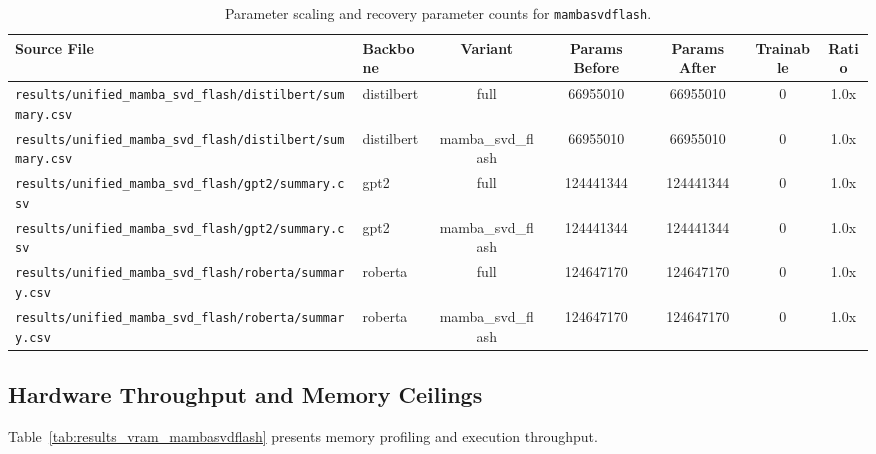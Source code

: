 \begin{table}[t]
\centering
\small
\begin{tabular}{llccccc}
\toprule
\textbf{Source File} & \textbf{Backbone} & \textbf{Variant} & \textbf{Params Before} & \textbf{Params After} & \textbf{Trainable} & \textbf{Ratio} \\
\midrule
\texttt{results/unified\_mamba\_svd\_flash/distilbert/summary.csv} & distilbert & full & 66955010 & 66955010 & 0 & 1.0x \\
\texttt{results/unified\_mamba\_svd\_flash/distilbert/summary.csv} & distilbert & mamba\_svd\_flash & 66955010 & 66955010 & 0 & 1.0x \\
\texttt{results/unified\_mamba\_svd\_flash/gpt2/summary.csv} & gpt2 & full & 124441344 & 124441344 & 0 & 1.0x \\
\texttt{results/unified\_mamba\_svd\_flash/gpt2/summary.csv} & gpt2 & mamba\_svd\_flash & 124441344 & 124441344 & 0 & 1.0x \\
\texttt{results/unified\_mamba\_svd\_flash/roberta/summary.csv} & roberta & full & 124647170 & 124647170 & 0 & 1.0x \\
\texttt{results/unified\_mamba\_svd\_flash/roberta/summary.csv} & roberta & mamba\_svd\_flash & 124647170 & 124647170 & 0 & 1.0x \\
\bottomrule
\end{tabular}
\caption{Parameter scaling and recovery parameter counts for \texttt{mambasvdflash}.}
\label{tab:results_params_mambasvdflash}
\end{table}

\subsection{Hardware Throughput and Memory Ceilings}
Table~\ref{tab:results_vram_mambasvdflash} presents memory profiling and execution throughput.

